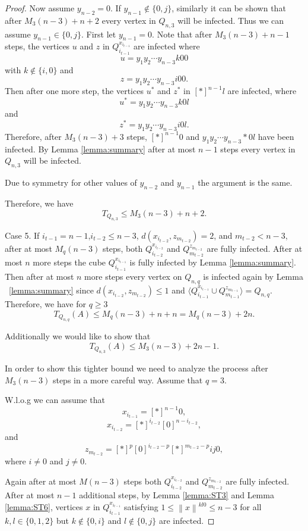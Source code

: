 \documentclass[10pt,a4paper]{amsart}
\renewcommand{\geq}{\geqslant}
\renewcommand{\leq}{\leqslant}
\begin{document}
\begin{proof}
Now assume $y_{n-2}=0$. If $y_{n-1} \notin \{0,j\}$, similarly it can be shown that after $M_3(n-3)+n+2$ every vertex in $Q_{n,3}$ will be infected. Thus we can assume $y_{n-1} \in \{0,j\}$. First let $y_{n-1}=0$. Note that after $M_3(n-3)+n-1$ steps, the vertices $u$ and $z$ in $Q_{i_{t-1}}^{x_{i_{t-1}}}$ are infected where 
$$u=y_1y_2 \cdots y_{n-3}k00$$
with $k \notin\{i,0\}$
and 
$$z=y_1y_2 \cdots y_{n-3}i00.$$
Then after one more step, the vertices $u^*$ and $z^*$ in $[\ast]^{n-1}l$ are infected, where 
$$u^*=y_1y_2 \cdots y_{n-3}k0l$$
and 
$$z^*=y_1y_2 \cdots y_{n-3}i0l.$$
Therefore, after $M_3(n-3)+3$ steps, $[\ast]^{n-1}0$ and $y_1y_2\cdots y_{n-3}\ast 0l$ have been infected. By Lemma \ref{lemma:summary} after at most $n-1$ steps every vertex in $Q_{n,3}$ will be infected. 

Due to symmetry for other values of $y_{n-2}$ and $y_{n-1}$ the argument is the same. 

Therefore, we have 
$$T_{Q_{n,3}} \leq M_3(n-3)+n+2.$$


Case 5. If $i_{t-1}=n-1$,$i_{t-2} \leq n-3$, $d(x_{i_{t-2}},z_{m_{t-2}})=2$, and $m_{t-2} < n-3$, after at most $M_q(n-3)$ steps, both $Q_{i_{t-2}}^{x_{i_{t-2}}}$ and $Q_{m_{t-2}}^{z_{m_{t-2}}}$ are fully infected. After at most $n$ more steps the cube $Q_{i_{t-1}}^{x_{i_{t-1}}}$ is fully infected by Lemma \ref{lemma:summary}. Then after at most $n$ more 
steps every vertex on $Q_{n,q}$ is infected again by Lemma ~\ref{lemma:summary} since $d(x_{i_{t-2}},z_{m_{t-2}}) \leq 1$ and $\langle Q_{i_{t-1}}^{x_{i_{t-1}}} \cup Q_{m_{t-1}}^{z_{m_{t-1}}} \rangle=Q_{n,q}.$ Therefore, we have for $q \geq 3$
$$T_{Q_{n,q}}(A) \leq M_q(n-3)+n+n=M_q(n-3)+2n.$$

Additionally we would like to show that 
$$T_{Q_{n,3}}(A) \leq M_3(n-3)+2n-1.$$

In order to show this tighter bound we need to analyze the process after $M_3(n-3)$ steps in a more careful way. Assume that $q=3$. 

W.l.o.g we can assume that 
$$x_{i_{t-1}}=[\ast]^{n-1}0,$$
$$x_{i_{t-2}}=[\ast]^{i_{t-2}}[0]^{n-i_{t-2}},$$
and 
$$z_{m_{t-2}}=[\ast]^p[0]^{i_{t-2}-p}[\ast]^{m_{t-2}-p}ij0,$$
where $i \neq 0$ and $j \neq 0$.

Again after at most $M(n-3)$ steps both $Q_{i_{t-2}}^{x_{i_{t-2}}}$ and $Q_{m_{t-2}}^{z_{m_{t-2}}}$ are fully infected. After at most $n-1$ additional steps, by Lemma \ref{lemma:ST3} and Lemma \ref{lemma:ST6}, vertices $x$ in $Q_{i_{t-1}}^{x_{i_{t-1}}}$ satisfying $ 1 \leq \left \lVert x \right \rVert^{kl0} \leq n-3$  for all $k,l\in \{0,1,2\}$ but $k \notin \{0,i\}$ and $l \notin \{0,j\}$ are infected.


\end{proof}
\end{document}
